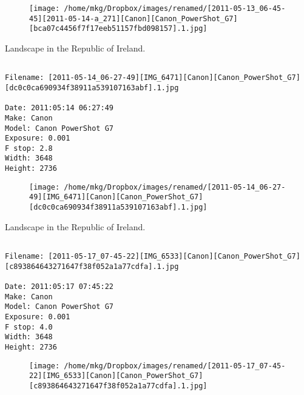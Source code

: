 \begin{figure}
\texttt{[image: /home/mkg/Dropbox/images/renamed/[2011-05-13\_06-45-45][2011-05-14-a\_271][Canon][Canon\_PowerShot\_G7][bca07c4456f7f17eeb51157fbd098157].1.jpg]}
\end{figure}
    
\clearpage
\onecolumn
\noindent Landscape in the Republic of Ireland.
\noindent
\begin{lstlisting}

Filename: [2011-05-14_06-27-49][IMG_6471][Canon][Canon_PowerShot_G7][dc0c0ca690934f38911a539107163abf].1.jpg

Date: 2011:05:14 06:27:49
Make: Canon
Model: Canon PowerShot G7
Exposure: 0.001
F stop: 2.8
Width: 3648
Height: 2736
\end{lstlisting}
\clearpage

\begin{figure}
\texttt{[image: /home/mkg/Dropbox/images/renamed/[2011-05-14\_06-27-49][IMG\_6471][Canon][Canon\_PowerShot\_G7][dc0c0ca690934f38911a539107163abf].1.jpg]}
\end{figure}
    
\clearpage
\onecolumn
\noindent Landscape in the Republic of Ireland.
\noindent
\begin{lstlisting}

Filename: [2011-05-17_07-45-22][IMG_6533][Canon][Canon_PowerShot_G7][c893864643271647f38f052a1a77cdfa].1.jpg

Date: 2011:05:17 07:45:22
Make: Canon
Model: Canon PowerShot G7
Exposure: 0.001
F stop: 4.0
Width: 3648
Height: 2736
\end{lstlisting}
\clearpage

\begin{figure}
\texttt{[image: /home/mkg/Dropbox/images/renamed/[2011-05-17\_07-45-22][IMG\_6533][Canon][Canon\_PowerShot\_G7][c893864643271647f38f052a1a77cdfa].1.jpg]}
\end{figure}
    
